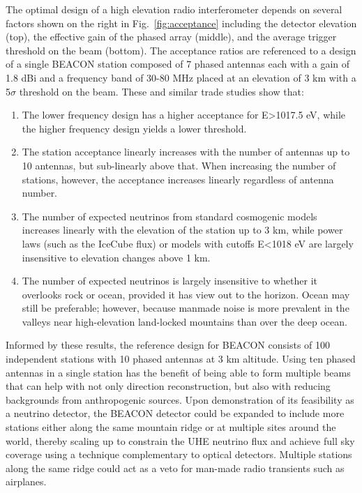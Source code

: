\documentclass[12pt]{article}
\begin{document}
The optimal design of a high elevation radio interferometer depends on several factors shown on the right in Fig.~\ref{fig:acceptance} including the detector elevation (top), the effective gain of the phased array (middle), and the average trigger threshold on the beam (bottom). The acceptance ratios are referenced to a design of a single BEACON station composed of 7 phased antennas each with a gain of 1.8 dBi and a frequency band of 30-80 MHz placed at an elevation of 3 km with a 5$\sigma$ threshold on the beam. These and similar trade studies show that:
\begin{enumerate}
\item	The lower frequency design has a higher acceptance for E>1017.5 eV, while the higher frequency design yields a lower threshold.
\item The station acceptance linearly increases with the number of antennas up to 10 antennas, but sub-linearly above that. When increasing the number of stations, however, the acceptance increases linearly regardless of antenna number.
\item The number of expected neutrinos from standard cosmogenic models increases linearly with the elevation of the station up to 3 km, while power laws (such as the IceCube flux) or models with cutoffs E<1018 eV are largely insensitive to elevation changes above 1 km. 
\item The number of expected neutrinos is largely insensitive to whether it overlooks rock or ocean, provided it has view out to the horizon. Ocean may still be preferable; however, because manmade noise is more prevalent in the valleys near high-elevation land-locked mountains than over the deep ocean.
\end{enumerate}

Informed by these results, the reference design for BEACON consists of 100 independent stations with 10 phased antennas at 3 km altitude. Using ten phased antennas in a single station has the benefit of being able to form multiple beams that can help with not only direction reconstruction, but also with reducing backgrounds from anthropogenic sources. Upon demonstration of its feasibility as a neutrino detector, the BEACON detector could be expanded to include  more stations either along the same mountain ridge or at multiple sites around the world, thereby scaling up to constrain the UHE neutrino flux and achieve full sky coverage using a technique complementary to optical detectors. Multiple stations along the same ridge could act as a veto for man-made radio transients such as airplanes. 
\end{document}
